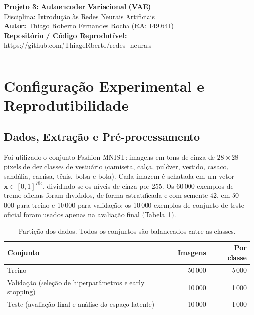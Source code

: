 \documentclass[11pt,a4paper]{article}
\begin{document}
\begin{center}
    {\LARGE \textbf{Projeto 3: Autoencoder Variacional (VAE)}} \\[0.35em]
    {\large Disciplina: Introdução às Redes Neurais Artificiais} \\[0.3em]
    \textbf{Autor:} Thiago Roberto Fernandes Rocha (RA: 149.641) \\[0.2em]
    \textbf{Repositório / Código Reprodutível:} \url{https://github.com/ThiagoRberto/redes_neurais}
\end{center}
\vspace{-0.5em}
\hrule
\vspace{0.8em}

\section{Configuração Experimental e Reprodutibilidade}

\subsection{Dados, Extração e Pré-processamento}
Foi utilizado o conjunto Fashion-MNIST: imagens em tons de cinza de $28\times28$ pixels de dez classes de vestuário (camiseta, calça, pulôver, vestido, casaco, sandália, camisa, tênis, bolsa e bota). Cada imagem é achatada em um vetor $\mathbf{x}\in[0,1]^{784}$, dividindo-se os níveis de cinza por 255. Os 60\,000 exemplos de treino oficiais foram divididos, de forma estratificada e com semente 42, em 50\,000 para treino e 10\,000 para validação; os 10\,000 exemplos do conjunto de teste oficial foram usados apenas na avaliação final (Tabela~\ref{tab:dados}).

\begin{table}[ht]
\centering
\small
\caption{Partição dos dados. Todos os conjuntos são balanceados entre as classes.}
\label{tab:dados}
\begin{tabular}{lrr}
\toprule
\textbf{Conjunto} & \textbf{Imagens} & \textbf{Por classe} \\
\midrule
Treino & 50\,000 & 5\,000 \\
Validação (seleção de hiperparâmetros e early stopping) & 10\,000 & 1\,000 \\
Teste (avaliação final e análise do espaço latente) & 10\,000 & 1\,000 \\
\bottomrule
\end{tabular}
\end{table}
\end{document}
